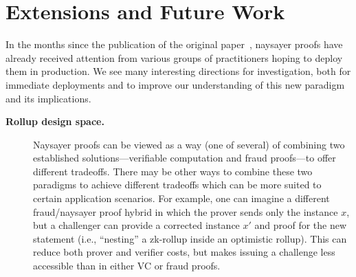 \section{Extensions and Future Work}\label{sec:naysayer_extensions}

In the months since the publication of the original paper~, naysayer proofs have already received attention from various groups of practitioners hoping to deploy them in production. We see many interesting directions for investigation, both for immediate deployments and to improve our understanding of this new paradigm and its implications.

\begin{description}
    \item[\textbf{Rollup design space.}] Naysayer proofs can be viewed as a way (one of several) of combining two established solutions---verifiable computation and fraud proofs---to offer different tradeoffs. There may be other ways to combine these two paradigms to achieve different tradeoffs which can be more suited to certain application scenarios. For example, one can imagine a different fraud/naysayer proof hybrid in which the prover sends only the instance $x$, but a challenger can provide a corrected instance $x'$ and proof for the new statement (i.e., ``nesting'' a zk-rollup inside an optimistic rollup). This can reduce both prover and verifier costs, but makes issuing a challenge less accessible than in either VC or fraud proofs.
    


\end{description}
